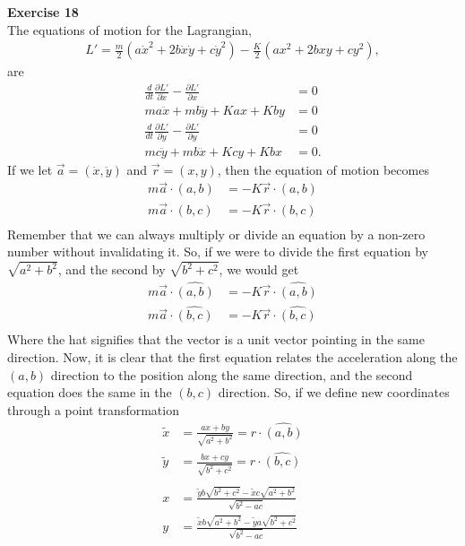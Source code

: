\documentclass[10pt]{article}
\begin{document}
\textbf{Exercise 18}\\
The equations of motion for the Lagrangian,
\begin{align*}
  L' = \frac{m}{2}\left( a\dot x^2 + 2b\dot x \dot y + c\dot y^2 \right) - \frac{K}{2}\left( ax^2 + 2bxy + c y^2 \right),
\end{align*}
are
\begin{align*}
  \frac{d}{dt}\frac{\partial L'}{\partial \dot x} -  \frac{\partial L'}{\partial x} &= 0\\
  ma\ddot x + mb\ddot y + Ka x + Kby &= 0\\
  \frac{d}{dt}\frac{\partial L'}{\partial \dot y} -  \frac{\partial L'}{\partial y} &= 0\\
  mc\ddot y + mb\ddot x + Kc y + Kbx &= 0.
\end{align*}
If we let $\vec a = (\ddot x, \ddot y)$ and $\vec r = (x,y)$, then the
equation of motion becomes
\begin{align*}
  m\vec a\cdot(a,b) &= -K\vec r\cdot(a,b)\\
  m\vec a\cdot(b,c) &= -K\vec r\cdot(b,c)\\
\end{align*}
Remember that we can always multiply or divide an equation by a non-zero number
without invalidating it.  So, if we were to divide the first equation by 
$\sqrt{a^2+b^2}$, and the second by $\sqrt{b^2+c^2}$, we would get
\begin{align*}
  m\vec a\cdot\hat{(a,b)} &= -K\vec r\cdot\hat{(a,b)}\\
  m\vec a\cdot\hat{(b,c)} &= -K\vec r\cdot\hat{(b,c)}\\
\end{align*}
Where the hat signifies that the vector is a unit vector pointing in the same
direction.  Now, it is clear that the first equation relates the acceleration
along the $(a,b)$ direction to the position along the same direction, and
the second equation does the same in the $(b,c)$ direction.  So, if we define
new coordinates through a point transformation
\begin{align*}
  \tilde x &= \frac{ax+by}{\sqrt{a^2+b^2}} = r\cdot\hat{(a,b)}\\
  \tilde y &= \frac{bx+cy}{\sqrt{b^2+c^2}} = r\cdot\hat{(b,c)}\\
  \\
  x &= \frac{\tilde y b \sqrt{b^2+c^2} - \tilde x c \sqrt{a^2+b^2} }{\sqrt{b^2-ac}}\\
  y &= \frac{\tilde x b \sqrt{a^2+b^2} - \tilde y a \sqrt{b^2+c^2} }{\sqrt{b^2-ac}}\\
\end{align*}
\end{document}
